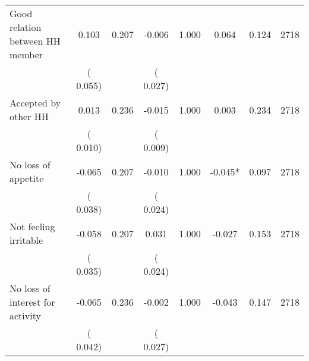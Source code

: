 \begin{tabular}{l*{7}{c}}
 Good relation between HH member       &              0.103       &        0.207  &             -0.006       &        1.000  &              0.064       &              0.124 &  2718 \\ 
                       &       (       0.055)             &                               &       (       0.027)                     &                               &                                               &                                &                      \\ 

 Accepted by other HH       &              0.013       &        0.236  &             -0.015       &        1.000  &              0.003       &              0.234 &  2718 \\ 
                       &       (       0.010)             &                               &       (       0.009)                     &                               &                                               &                                &                      \\ 

 No loss of appetite       &             -0.065       &        0.207  &             -0.010       &        1.000  &             -0.045*       &              0.097 &  2718 \\ 
                       &       (       0.038)             &                               &       (       0.024)                     &                               &                                               &                                &                      \\ 

 Not feeling irritable       &             -0.058       &        0.207  &              0.031       &        1.000  &             -0.027       &              0.153 &  2718 \\ 
                       &       (       0.035)             &                               &       (       0.024)                     &                               &                                               &                                &                      \\ 

 No loss of interest for activity       &             -0.065       &        0.236  &             -0.002       &        1.000  &             -0.043       &              0.147 &  2718 \\ 
                       &       (       0.042)             &                               &       (       0.027)                     &                               &                                               &                                &                      \\ 


\end{tabular}
